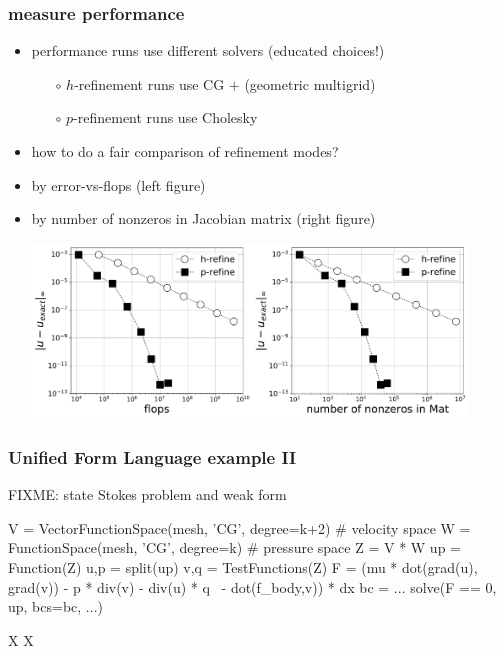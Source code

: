 \documentclass[hide notes,intlimits,usenames,dvipsnames]{beamer}
\begin{document}
\begin{frame}[fragile]
\frametitle{measure performance}
\begin{itemize}
\item performance runs use different solvers (educated choices!)
    \begin{itemize}
    \item[$\circ$] $h$-refinement runs use CG $+$ (geometric multigrid)
    \item[$\circ$] $p$-refinement runs use Cholesky
    \end{itemize}
\item how to do a fair comparison of refinement modes?
\item by error-vs-flops (left figure)
\item by number of nonzeros in Jacobian matrix (right figure)

\medskip
\mbox{\includegraphics[width=0.46\textwidth]{hprefine-Linf-flops}\quad\includegraphics[width=0.45\textwidth]{hprefine-Linf-nnz}}
\end{itemize}
\end{frame}


\begin{frame}[fragile]
\frametitle{Unified Form Language example II}

FIXME: state Stokes problem and weak form
\begin{scode}
V = VectorFunctionSpace(mesh, 'CG', degree=k+2)  # velocity space
W = FunctionSpace(mesh, 'CG', degree=k)          # pressure space
Z = V * W
up = Function(Z)
u,p = split(up)
v,q = TestFunctions(Z)
F = (mu * dot(grad(u), grad(v)) - p * div(v) - div(u) * q \
     - dot(f_body,v)) * dx
bc = ...
solve(F == 0, up, bcs=bc, ...)
\end{scode}
\end{frame}


\begin{frame}{X}
X
\end{frame}
\end{document}
